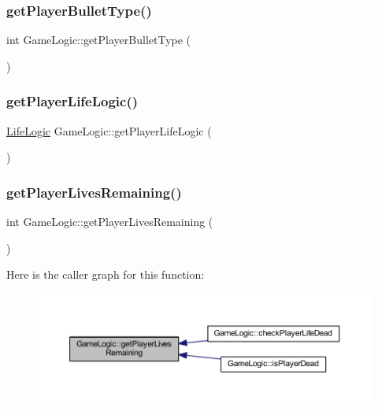 \subsubsection{\texorpdfstring{get\+Player\+Bullet\+Type()}{getPlayerBulletType()}}
{\footnotesize\ttfamily int Game\+Logic\+::get\+Player\+Bullet\+Type (\begin{DoxyParamCaption}{ }\end{DoxyParamCaption})}

\mbox{\label{class_game_logic_ad30541663e6b28e997646173fbdf344e}} 
\subsubsection{\texorpdfstring{get\+Player\+Life\+Logic()}{getPlayerLifeLogic()}}
{\footnotesize\ttfamily \hyperlink{class_life_logic}{Life\+Logic} Game\+Logic\+::get\+Player\+Life\+Logic (\begin{DoxyParamCaption}{ }\end{DoxyParamCaption})}

\mbox{\label{class_game_logic_a42fb536e1740b6eeb4f80840250d685f}} 
\subsubsection{\texorpdfstring{get\+Player\+Lives\+Remaining()}{getPlayerLivesRemaining()}}
{\footnotesize\ttfamily int Game\+Logic\+::get\+Player\+Lives\+Remaining (\begin{DoxyParamCaption}{ }\end{DoxyParamCaption})}

Here is the caller graph for this function\+:\nopagebreak
\begin{figure}[H]
\begin{center}
\leavevmode
\includegraphics[width=350pt]{class_game_logic_a42fb536e1740b6eeb4f80840250d685f_icgraph}
\end{center}
\end{figure}
\mbox{\label{class_game_logic_a7aeb038bd7a0feef3377745ae334011c}} 
